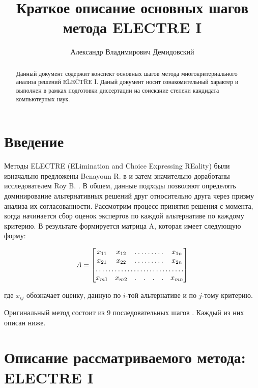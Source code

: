 \documentclass{article}
\title{Краткое описание основных шагов метода ELECTRE I}
\author{Александр Владимирович Демидовский}
\begin{document}
\maketitle

\begin{abstract}
Данный документ содержит конспект основных шагов метода многокритериального анализа решений  ELECTRE I. Даный документ носит ознакомительный характер и выполнен в рамках подготовки диссертации на соискание степени кандидата компьютерных наук.
\end{abstract}

\section{Введение}

    Методы ELECTRE (ELimination and Choice Expressing REality) были изначально предложены
    Benayoun R. в \cite{scm:electre:2:benayoun1966manual} и затем значительно доработаны
    исследователем Roy B. \cite{scm:electre:3:roy1968classement}. В общем, данные подходы
    позволяют определять доминирование альтернативных решений друг относительно друга через
    призму анализа их согласованности. Рассмотрим процесс принятия решения с момента, когда
    начинается сбор оценок экспертов по каждой альтернативе по каждому критерию. В результате
    формируется матрица A, которая имеет следующую форму:

    \begin{equation}
    \label{eq:decision_matrix}
        A = \begin{bmatrix}
            x_{11}&  x_{12}& \hdotsfor{4} & x_{1n}\\
            x_{21}&  x_{22}& \hdotsfor{4} & x_{2n}\\
        \hdotsfor{7}\\
        x_{m1}&  x_{m2}& . & . & . & . & x_{mn}\\
        \end{bmatrix}
    \end{equation}

    где \(x_{ij}\) обозначает оценку, данную по \(i\)-той альтернативе и по \(j\)-тому критерию.

    Оригинальный метод состоит из 9 последовательных шагов
    \cite{scm:electre:1:hwang1981methods}. Каждый из них описан ниже.

\section{Описание рассматриваемого метода: ELECTRE I}
\end{document}
